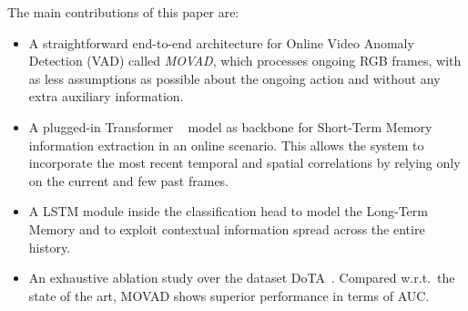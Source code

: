 The main contributions of this paper are:
\begin{itemize}%
    \item A straightforward end-to-end architecture for Online Video Anomaly Detection (VAD) called \emph{MOVAD}, which processes ongoing RGB frames, with as less assumptions as possible about the ongoing action and without any extra auxiliary information.
    \item A plugged-in Transformer ~\cite{liu_video_2022} model as backbone for Short-Term Memory information extraction in an online scenario.
    This allows the system to incorporate the most recent temporal and spatial correlations by relying only on the current and few past frames.
    \item A LSTM module inside the classification head to model the Long-Term Memory and to exploit contextual information spread across the entire history.
    \item An exhaustive ablation study over the dataset DoTA~\cite{9712446}.
    Compared w.r.t.~the state of the art, MOVAD shows superior performance in terms of AUC.
\end{itemize}